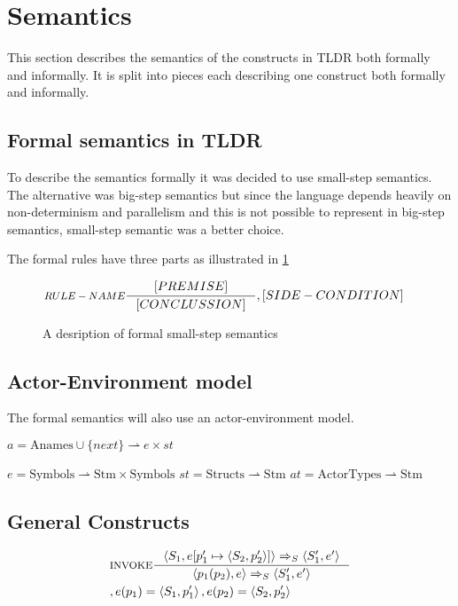 \section{Semantics}
This section describes the semantics of the constructs in TLDR both formally and informally. It is split into pieces each describing one construct both formally and informally.

\subsection{Formal semantics in TLDR}
To describe the semantics formally it was decided to use small-step semantics. The alternative was big-step semantics but since the language depends heavily on non-determinism and parallelism and this is not possible to represent in big-step semantics, small-step semantic was a better choice.

The formal rules have three parts as illustrated in \cref{SS-semantics}

\begin{figure}[H]
\begin{align*}
&\inference[$RULE-NAME$]{[PREMISE]}
												{[CONCLUSSION]}
												{,[SIDE-CONDITION]}
\end{align*}
\caption{A desription of formal small-step semantics}
\label{SS-semantics}
\end{figure}

\subsection{Actor-Environment model}
The formal semantics will also use an actor-environment model.

$a = \text{Anames} \cup \{next\} \rightharpoonup e \times st$

$e = \text{Symbols} \rightharpoonup \text{Stm} \times \text{Symbols}$
$st = \text{Structs} \rightharpoonup \text{Stm}$
$at = \text{ActorTypes} \rightharpoonup \text{Stm}$

\subsection{General Constructs}
\begin{align*}
&\inference[$\text{INVOKE}$]{\Braket{S_1,e[p_1' \mapsto \Braket{S_2,p_2'}]} \Rightarrow_S \Braket{S_1',e'}}
                  {\Braket{p_1(p_2),e} \Rightarrow_S \Braket{S_1',e'}}
\\
&									{,e(p_1) = \Braket{S_1,p_1'}, e(p_2) = \Braket{S_2,p_2'}}
\end{align*}





